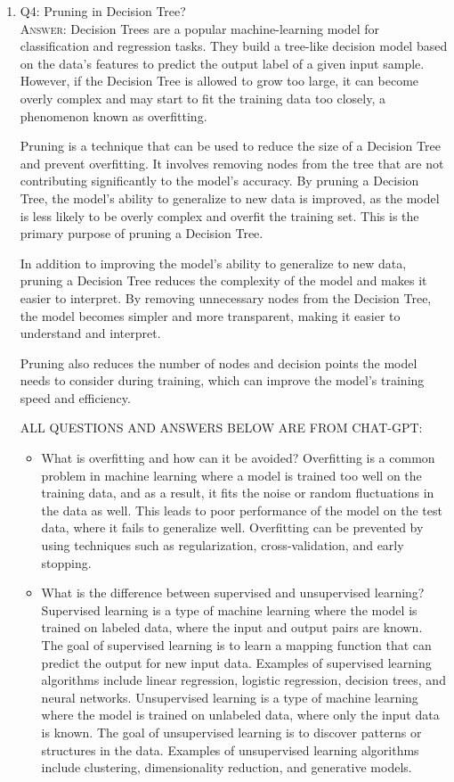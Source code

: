 \documentclass[11pt]{article}
\begin{document}
\begin{enumerate}
\item Q4: Pruning in Decision Tree?\\
\textsc{Answer:} Decision Trees are a popular machine-learning model for classification and regression tasks. They build a tree-like decision model based on the data's features to predict the output label of a given input sample. However, if the Decision Tree is allowed to grow too large, it can become overly complex and may start to fit the training data too closely, a phenomenon known as overfitting. 

Pruning is a technique that can be used to reduce the size of a Decision Tree and prevent overfitting. It involves removing nodes from the tree that are not contributing significantly to the model's accuracy. By pruning a Decision Tree, the model's ability to generalize to new data is improved, as the model is less likely to be overly complex and overfit the training set. This is the primary purpose of pruning a Decision Tree.

In addition to improving the model's ability to generalize to new data, pruning a Decision Tree reduces the complexity of the model and makes it easier to interpret. By removing unnecessary nodes from the Decision Tree, the model becomes simpler and more transparent, making it easier to understand and interpret.

Pruning also reduces the number of nodes and decision points the model needs to consider during training, which can improve the model's training speed and efficiency.


ALL QUESTIONS AND ANSWERS BELOW ARE FROM CHAT-GPT:


\begin{itemize} 
\item What is overfitting and how can it be avoided? Overfitting is a common problem in machine learning where a model is trained too well on the training data, and as a result, it fits the noise or random fluctuations in the data as well. This leads to poor performance of the model on the test data, where it fails to generalize well. Overfitting can be prevented by using techniques such as regularization, cross-validation, and early stopping.

\item What is the difference between supervised and unsupervised learning? Supervised learning is a type of machine learning where the model is trained on labeled data, where the input and output pairs are known. The goal of supervised learning is to learn a mapping function that can predict the output for new input data. Examples of supervised learning algorithms include linear regression, logistic regression, decision trees, and neural networks.
Unsupervised learning is a type of machine learning where the model is trained on unlabeled data, where only the input data is known. The goal of unsupervised learning is to discover patterns or structures in the data. Examples of unsupervised learning algorithms include clustering, dimensionality reduction, and generative models.


\end{itemize}
\end{enumerate}
\end{document}
